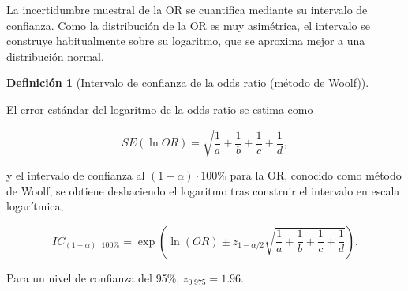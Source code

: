 \documentclass[
  spanish,
  a4paper,
]{scrreport}
\theoremstyle{definition}
\theoremstyle{definition}
\newtheorem{definition}{Definición}[chapter]
\theoremstyle{remark}
\begin{document}
La incertidumbre muestral de la OR se cuantifica mediante su intervalo
de confianza. Como la distribución de la OR es muy asimétrica, el
intervalo se construye habitualmente sobre su logaritmo, que se aproxima
mejor a una distribución normal.

\begin{definition}[Intervalo de confianza de la odds ratio (método de
Woolf)]\protect\hypertarget{def-casoscontroles-ic-odds-ratio}{}\label{def-casoscontroles-ic-odds-ratio}

El error estándar del logaritmo de la odds ratio se estima como

\[SE(\ln OR) = \sqrt{\frac{1}{a}+\frac{1}{b}+\frac{1}{c}+\frac{1}{d}},\]

y el intervalo de confianza al \((1-\alpha)\cdot 100\%\) para la OR,
conocido como método de Woolf, se obtiene deshaciendo el logaritmo tras
construir el intervalo en escala logarítmica,

\[IC_{(1-\alpha)\cdot100\%} = \exp\left(\ln(OR) \pm z_{1-\alpha/2}\sqrt{\frac{1}{a}+\frac{1}{b}+\frac{1}{c}+\frac{1}{d}}\right).\]

Para un nivel de confianza del 95\%, \(z_{0.975}=1.96\).

\end{definition}
\end{document}
